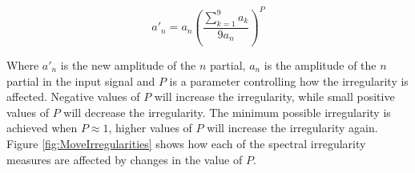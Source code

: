 		\begin{equation}
			a'_{n} = a_{n} \left( \frac{\sum_{k = 1}^{9} a_{k}}{9a_{n}} \right) ^{P}
			\label{eq:PartialSmoothing}
		\end{equation}

		Where $a'_{n}$ is the new amplitude of the $n$ partial, $a_{n}$ is the amplitude of the
		$n$ partial in the input signal and $P$ is a parameter controlling how the irregularity is
		affected. Negative values of $P$ will increase the irregularity, while small positive values of $P$ will
		decrease the irregularity. The minimum possible irregularity is achieved when $P \approx 1$, higher values
		of $P$ will increase the irregularity again. Figure \ref{fig:MoveIrregularities} shows how each of the
		spectral irregularity measures are affected by changes in the value of $P$.

